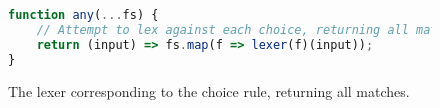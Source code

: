 \begin{figure}
    \centering
    \begin{lstlisting}[language=JavaScript]
function any(...fs) {
    // Attempt to lex against each choice, returning all matches.
    return (input) => fs.map(f => lexer(f)(input));
}\end{lstlisting}
    \caption{The lexer corresponding to the choice rule, returning all matches.}
    \label{fig:any-lexer}
\end{figure}